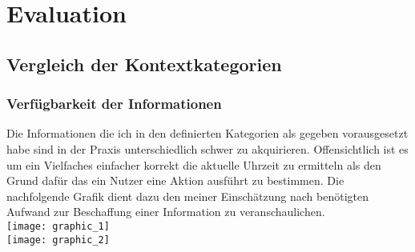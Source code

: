 \chapter{Evaluation}%
\label{cha:evaluation}



\section{Vergleich der Kontextkategorien} 
\subsection{Verfügbarkeit der Informationen}
Die Informationen die ich in den definierten Kategorien als gegeben vorausgesetzt habe sind in der Praxis unterschiedlich schwer zu akquirieren. Offensichtlich ist es um ein Vielfaches einfacher korrekt die aktuelle Uhrzeit zu ermitteln als den Grund dafür das ein Nutzer eine Aktion ausführt zu bestimmen. Die nachfolgende Grafik dient dazu den meiner Einschätzung nach benötigten Aufwand zur Beschaffung einer Information zu veranschaulichen.\\
\texttt{[image: graphic\_1]}\\
\texttt{[image: graphic\_2]}\pagebreak
